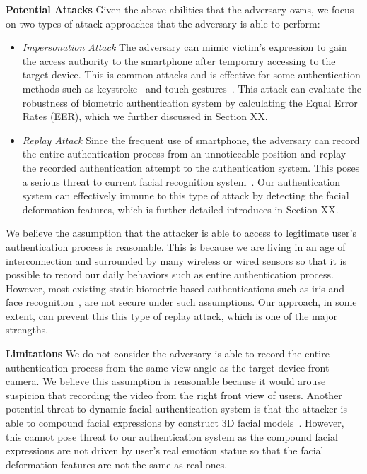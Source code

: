         \noindent \textbf{Potential Attacks} Given the above abilities that the adversary owns, we focus on two types of attack approaches that the adversary is able to perform:
        \begin{itemize}
            \item \emph{Impersonation Attack} The adversary can mimic victim's expression to gain the access authority to the smartphone after temporary accessing to the target device. This is common attacks and is effective for some authentication methods such as keystroke~\cite{Phoha2012Hidden} and touch gestures~\cite{de2012touch}. This attack can evaluate the robustness of biometric authentication system by calculating the Equal Error Rates (EER), which we further discussed in Section XX.
            \item \emph{Replay Attack} Since the frequent use of smartphone, the adversary can record the entire authentication process from an unnoticeable position and replay the recorded authentication attempt to the authentication system. This poses a serious threat to current facial recognition system~\cite{GoldenEye2012Hegde}. Our authentication system can effectively immune to this type of attack by detecting the facial deformation features, which is further detailed introduces in Section XX.
        \end{itemize} 
        We believe the assumption that the attacker is able to access to legitimate user's authentication process is reasonable. This is because we are living in an age of interconnection and surrounded by many wireless or wired sensors so that it is possible to record our daily behaviors such as entire authentication process. However, most existing static biometric-based authentications such as iris and face recognition~\cite{Boehm2013SAFE}, are not secure under such assumptions. Our approach, in some extent, can prevent this this type of replay attack, which is one of the major strengths.
        
        \noindent \textbf{Limitations} We do not consider the adversary is able to record the entire authentication process from the same view angle as the target device front camera. We believe this assumption is reasonable because it would arouse suspicion that recording the video from the right front view of users. Another potential threat to dynamic facial authentication system is that the attacker is able to compound facial expressions by construct 3D facial models~\cite{Xu2016VirtualU}. However, this cannot pose threat to our authentication system as the compound facial expressions are not driven by user's real emotion statue so that the facial deformation features are not the same as real ones.
         
        
